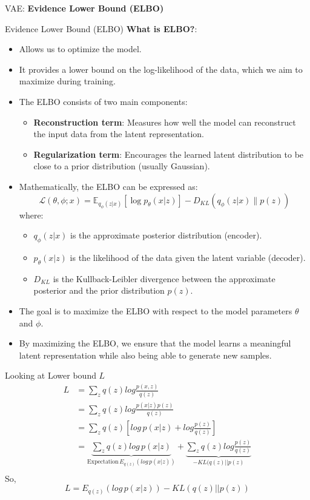 \begin{frame}{}
    \LARGE VAE: \textbf{Evidence Lower Bound (ELBO)}
\end{frame}

\begin{frame}[allowframebreaks]{Evidence Lower Bound (ELBO)}
\textbf{What is ELBO?}:
\begin{itemize}
    \item Allows us to optimize the model.
    \item It provides a lower bound on the log-likelihood of the data, which we aim to maximize during training.
    \item The ELBO consists of two main components:
    \begin{itemize}
        \item \textbf{Reconstruction term}: Measures how well the model can reconstruct the input data from the latent representation.
        \item \textbf{Regularization term}: Encourages the learned latent distribution to be close to a prior distribution (usually Gaussian).
    \end{itemize}
    \framebreak
    \item Mathematically, the ELBO can be expressed as:
    \[
    \mathcal{L}(\theta, \phi; x) = \mathbb{E}_{q_\phi(z|x)}[\log p_\theta(x|z)] - D_{KL}(q_\phi(z|x) \| p(z))
    \]
    where:
    \begin{itemize}
        \item \( q_\phi(z|x) \) is the approximate posterior distribution (encoder).
        \item \( p_\theta(x|z) \) is the likelihood of the data given the latent variable (decoder).
        \item \( D_{KL} \) is the Kullback-Leibler divergence between the approximate posterior and the prior distribution \( p(z) \).
    \end{itemize}
    \item The goal is to maximize the ELBO with respect to the model parameters \( \theta \) and \( \phi \).
    \item By maximizing the ELBO, we ensure that the model learns a meaningful latent representation while also being able to generate new samples.
\end{itemize}

\framebreak

Looking at Lower bound $L$
\begin{equation*}
    \begin{split}
        L & = \sum_z q(z) log \frac{p(x,z)}{q(z)}\\
        & = \sum_z q(z) log \frac{p(x|z)p(z)}{q(z)}\\
        & = \sum_z q(z) \left [log \, p(x|z) + log \frac{p(z)}{q(z)} \right ]\\
        & = \underbrace{\sum_z q(z) log \, p(x|z)}_{\text {Expectation} \, E_{q(z)}(log \, p(x|z))} + \underbrace{\sum_z q(z) log \frac{p(z)}{q(z)}}_{-KL(q(z)||p(z)} \\
    \end{split}
\end{equation*}
So,
$$L = E_{q(z)}(log \, p(x|z)) - KL(q(z)||p(z))$$


\end{frame}
